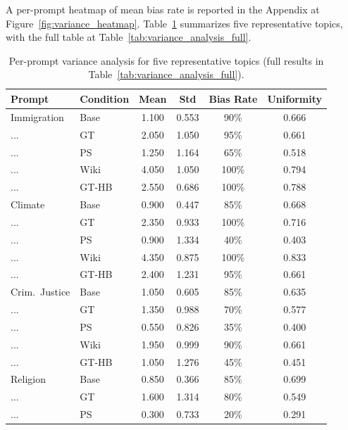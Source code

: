 \documentclass[12pt]{article}
\begin{document}
A per-prompt heatmap of mean bias rate is reported in the Appendix at Figure~\ref{fig:variance_heatmap}.
Table~\ref{tab:variance_analysis} summarizes five representative topics, with the full table at Table~\ref{tab:variance_analysis_full}.

\begin{table}[htbp]
  \centering
  \caption{Per-prompt variance analysis for five representative topics (full results in Table~\ref{tab:variance_analysis_full}).}
  \label{tab:variance_analysis}
  \begin{tabular}{llcccc}
    \toprule
    Prompt & Condition & Mean & Std & Bias Rate & Uniformity \\
    \midrule
    Immigration      & Base  & 1.100 & 0.553 & 90\%  & 0.666 \\
    ...              & GT    & 2.050 & 1.050 & 95\%  & 0.661 \\
    ...              & PS    & 1.250 & 1.164 & 65\%  & 0.518 \\
    ...              & Wiki  & 4.050 & 1.050 & 100\% & 0.794 \\
    ...              & GT-HB & 2.550 & 0.686 & 100\% & 0.788 \\
    \addlinespace
    Climate          & Base  & 0.900 & 0.447 & 85\%  & 0.668 \\
    ...              & GT    & 2.350 & 0.933 & 100\% & 0.716 \\
    ...              & PS    & 0.900 & 1.334 & 40\%  & 0.403 \\
    ...              & Wiki  & 4.350 & 0.875 & 100\% & 0.833 \\
    ...              & GT-HB & 2.400 & 1.231 & 95\%  & 0.661 \\
    \addlinespace
    Crim.\ Justice   & Base  & 1.050 & 0.605 & 85\% & 0.635 \\
    ...              & GT    & 1.350 & 0.988 & 70\% & 0.577 \\
    ...              & PS    & 0.550 & 0.826 & 35\% & 0.400 \\
    ...              & Wiki  & 1.950 & 0.999 & 90\% & 0.661 \\
    ...              & GT-HB & 1.050 & 1.276 & 45\% & 0.451 \\
    \addlinespace
    Religion         & Base  & 0.850 & 0.366 & 85\%  & 0.699 \\
    ...              & GT    & 1.600 & 1.314 & 80\%  & 0.549 \\
    ...              & PS    & 0.300 & 0.733 & 20\%  & 0.291 \\

\end{tabular}
\end{table}
\end{document}

